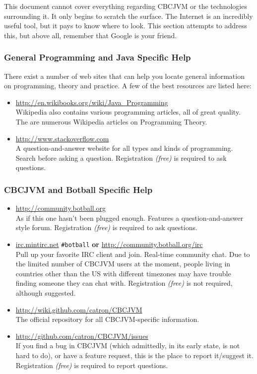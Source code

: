 \documentclass[12pt,letterpaper]{article}
\begin{document}
This document cannot cover everything regarding CBCJVM or the technologies surrounding it. It only begins to scratch the surface. The Internet is an incredibly useful tool, but it pays to know where to look. This section attempts to address this, but above all, remember that Google is your friend.



\subsubsection{General Programming and Java Specific Help}

There exist a number of web sites that can help you locate general information on programming, theory and practice. A few of the best resources are listed here:
\begin{itemize}
\item \url{http://en.wikibooks.org/wiki/Java_Programming}\\
      Wikipedia also contains various programming articles, all of great quality. The are numerous Wikipedia articles on Programming Theory.
\item \url{http://www.stackoverflow.com}\\
      A question-and-answer website for all types and kinds of programming. Search before asking a question. Registration \textit{(free)} is required to ask questions.
\end{itemize}



\subsubsection{CBCJVM and Botball Specific Help}

\begin{itemize}
\item \url{http://community.botball.org}\\
      As if this one hasn't been plugged enough. Features a question-and-answer style forum. Registration \textit{(free)} is required to ask questions.
\item \url{irc.mintirc.net} \texttt{{\#}botball} \textbf{or} \url{http://community.botball.org/irc}\\
      Pull up your favorite IRC client and join. Real-time community chat. Due to the limited number of CBCJVM users at the moment, people living in countries other than the US with different timezones may have trouble finding someone they can chat with. Registration \textit{(free)} is not required, although suggested.
\item \url{http://wiki.github.com/catron/CBCJVM}\\
      The official repository for all CBCJVM-specific information.
\item \url{http://github.com/catron/CBCJVM/issues}\\
      If you find a bug in CBCJVM (which admittedly, in its early state, is not hard to do), or have a feature request, this is the place to report it/suggest it. Registration \textit{(free)} is required to report questions.
\end{itemize}
\end{document}
